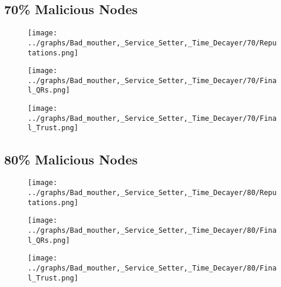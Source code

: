 \documentclass{article}
\begin{document}
  \begin{minipage}[t]{0.49\columnwidth}
    \subsection*{70\% Malicious Nodes}
        \begin{figure}[H]
            \centering
            \texttt{[image: ../graphs/Bad\_mouther,\_Service\_Setter,\_Time\_Decayer/70/Reputations.png]}
        \end{figure}
        \begin{figure}[H]
            \centering
            \texttt{[image: ../graphs/Bad\_mouther,\_Service\_Setter,\_Time\_Decayer/70/Final\_QRs.png]}
        \end{figure}
    \end{minipage}
    \begin{minipage}[t]{0.49\columnwidth}
        \begin{figure}[H]
            \centering
            \texttt{[image: ../graphs/Bad\_mouther,\_Service\_Setter,\_Time\_Decayer/70/Final\_Trust.png]}
        \end{figure}
    \end{minipage}

  \begin{minipage}[t]{0.49\columnwidth}
    \subsection*{80\% Malicious Nodes}
        \begin{figure}[H]
            \centering
            \texttt{[image: ../graphs/Bad\_mouther,\_Service\_Setter,\_Time\_Decayer/80/Reputations.png]}
        \end{figure}
        \begin{figure}[H]
            \centering
            \texttt{[image: ../graphs/Bad\_mouther,\_Service\_Setter,\_Time\_Decayer/80/Final\_QRs.png]}
        \end{figure}
    \end{minipage}
    \begin{minipage}[t]{0.49\columnwidth}
        \begin{figure}[H]
            \centering
            \texttt{[image: ../graphs/Bad\_mouther,\_Service\_Setter,\_Time\_Decayer/80/Final\_Trust.png]}
        \end{figure}
    \end{minipage}
\end{document}
